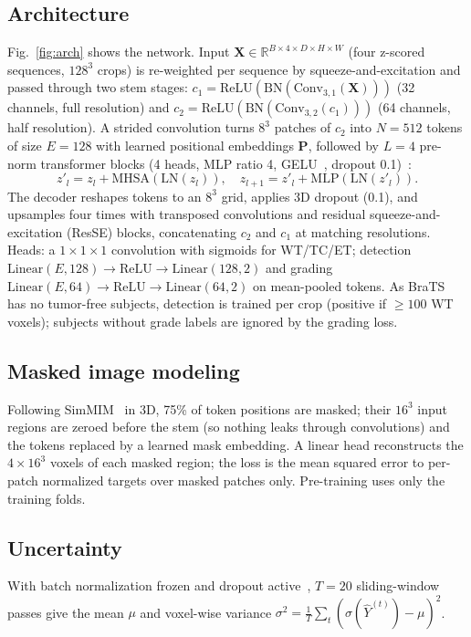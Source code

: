\documentclass[journal]{IEEEtran}
\begin{document}
\subsection{Architecture}
Fig.~\ref{fig:arch} shows the network. Input $\mathbf{X}\in\mathbb{R}^{B\times4\times D\times H\times W}$ (four z-scored sequences, $128^3$ crops) is re-weighted per sequence by squeeze-and-excitation and passed through two stem stages:
$c_1=\mathrm{ReLU}(\mathrm{BN}(\mathrm{Conv}_{3,1}(\mathbf{X})))$ (32 channels, full resolution) and $c_2=\mathrm{ReLU}(\mathrm{BN}(\mathrm{Conv}_{3,2}(c_1)))$ (64 channels, half resolution).
A strided convolution turns $8^3$ patches of $c_2$ into $N=512$ tokens of size $E=128$ with learned positional embeddings $\mathbf{P}$, followed by $L=4$ pre-norm transformer blocks (4 heads, MLP ratio 4, GELU~\cite{hendrycks2016gelu}, dropout 0.1)~\cite{ba2016layernorm}:
\begin{equation}
z'_l=z_l+\mathrm{MHSA}(\mathrm{LN}(z_l)),\quad z_{l+1}=z'_l+\mathrm{MLP}(\mathrm{LN}(z'_l)).
\end{equation}
The decoder reshapes tokens to an $8^3$ grid, applies 3D dropout (0.1), and upsamples four times with transposed convolutions and residual squeeze-and-excitation (ResSE) blocks, concatenating $c_2$ and $c_1$ at matching resolutions. Heads: a $1\times1\times1$ convolution with sigmoids for WT/TC/ET; detection $\mathrm{Linear}(E,128)\!\rightarrow\!\mathrm{ReLU}\!\rightarrow\!\mathrm{Linear}(128,2)$ and grading $\mathrm{Linear}(E,64)\!\rightarrow\!\mathrm{ReLU}\!\rightarrow\!\mathrm{Linear}(64,2)$ on mean-pooled tokens. As BraTS has no tumor-free subjects, detection is trained per crop (positive if $\geq100$ WT voxels); subjects without grade labels are ignored by the grading loss.

\subsection{Masked image modeling}
Following SimMIM~\cite{xie2022simmim} in 3D, 75\% of token positions are masked; their $16^3$ input regions are zeroed before the stem (so nothing leaks through convolutions) and the tokens replaced by a learned mask embedding. A linear head reconstructs the $4\times16^3$ voxels of each masked region; the loss is the mean squared error to per-patch normalized targets over masked patches only. Pre-training uses only the training folds.

\subsection{Uncertainty}
With batch normalization frozen and dropout active~\cite{gal2016}, $T=20$ sliding-window passes give the mean $\mu$ and voxel-wise variance $\sigma^2=\frac{1}{T}\sum_t(\sigma(\hat{Y}^{(t)})-\mu)^2$.
\end{document}
